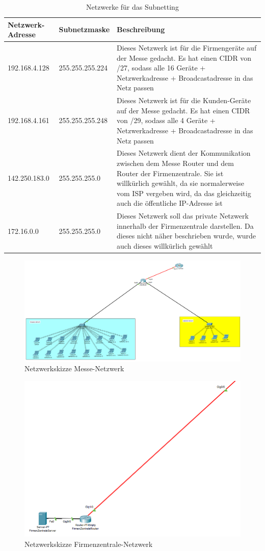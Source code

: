 \begin{table}[h]
	\centering
	\begin{tabular}{p{0.2\linewidth}|p{0.2\linewidth}|p{0.6\linewidth}}
		Netzwerk-Adresse & Subnetzmaske & Beschreibung \\ \hline
		192.168.4.128 & 255.255.255.224 & Dieses Netzwerk ist für die Firmengeräte auf der Messe gedacht. Es hat einen CIDR von /27, sodass alle 16 Geräte + Netzwerkadresse + Broadcastadresse in das Netz passen \\ \hline
		192.168.4.161 & 255.255.255.248 & Dieses Netzwerk ist für die Kunden-Geräte auf der Messe gedacht. Es hat einen CIDR von /29, sodass alle 4 Geräte + Netzwerkadresse + Broadcastadresse in das Netz passen \\ \hline
		142.250.183.0 & 255.255.255.0 & Dieses Netzwerk dient der Kommunikation zwischen dem Messe Router und dem Router der Firmenzentrale. Sie ist willkürlich gewählt, da sie normalerweise vom ISP vergeben wird, da das gleichzeitig auch die öffentliche IP-Adresse ist \\ \hline
		172.16.0.0 & 255.255.255.0 & Dieses Netzwerk soll das private Netzwerk innerhalb der Firmenzentrale darstellen. Da dieses nicht näher beschrieben wurde, wurde auch dieses willkürlich gewählt 
	\end{tabular}
\caption{Netzwerke für das Subnetting}
\end{table}

\begin{figure}[h]
	\centering
	\includegraphics[width=0.95\linewidth]{Images/Netzwerk1}
	\caption{Netzwerkskizze Messe-Netzwerk}
	\label{fig:netzwerk1}
\end{figure}

\begin{figure}[h]
	\centering
	\includegraphics[width=0.7\linewidth]{Images/Netzwerk2}
	\caption{Netzwerkskizze Firmenzentrale-Netzwerk}
	\label{fig:netzwerk2}
\end{figure}


